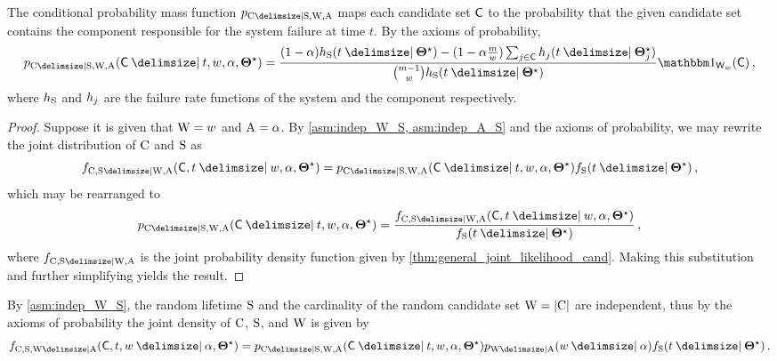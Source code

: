 \documentclass[
    11pt,
    extrafontsizes,
    article,
    oldfontcommands,
    final,
    oneside,
    openany,
    hidelinks]{memoir}
\begin{document}
\begin{corollary}
	\label{def:general_cond_cand_probability_alpha}
	The conditional probability mass function $\pmf_{\rvcand \Given \sv, \RV{W}, \RV{A}}$ maps each candidate set $\cand$ to the probability that the given candidate set contains the component responsible for the system failure at time $t$.
	By the axioms of probability,
	\begin{equation}
	\begin{split}
	\label{eq:general_cond_cand_probability_alpha}
	\pmf_{\rvcand \Given \sv, \RV{W}, \RV{A}}(\cand \Given t, w, \alpha, \tparam\sysparam) =
	\frac{(1-\alpha) \haz_{\sv}(t \Given \tparam\sysparam) - (1-\alpha\frac{m}{w}) \sum_{j \in \cand} \haz_j(t \Given \tparam\sysparam_j)}{\binom{m-1}{w} \haz_{\sv}(t \Given \tparam\sysparam)}
	\SetIndicator{\candsw{w}}(\cand)\,,
	\end{split}
	\end{equation}
	where $h_{\mathrm{S}}$ and $h_j$ are the failure rate functions of the system 
	and the \jth component respectively.
\end{corollary}
\begin{proof}
Suppose it is given that $\mathrm{W} = w$ and $\mathrm{A} = \alpha$.
By \cref{asm:indep_W_S, asm:indep_A_S} and the axioms of probability, we may rewrite the joint distribution of $\mathrm{C}$ and $\mathrm{S}$ as
\begin{equation}
\pdf_{\rvcand,\sv \Given \RV{W}, \RV{A}}(\cand, t \Given w, \alpha, \tparam\sysparam) =
\pmf_{\rvcand \Given \sv, \RV{W}, \RV{A}}(\cand \Given t, w, \alpha, \tparam\sysparam) \spdf(t \Given \tparam\sysparam)\,,
\end{equation}
which may be rearranged to
\begin{equation}
\pmf_{\rvcand \Given \sv, \RV{W}, \RV{A}}(\cand \Given t, w, \alpha, \tparam\sysparam) = \frac
{
	\pdf_{\rvcand, \sv \Given \RV{W}, \RV{A}}(\cand, t \Given w, \alpha, \tparam\sysparam)
}
{
	\spdf(t \Given \tparam\sysparam)
}\,,
\end{equation}
where $\pdf_{\rvcand, \sv \Given \RV{W}, \RV{A}}$ is the joint probability density function given by \cref{thm:general_joint_likelihood_cand}.
Making this substitution and further simplifying yields the result.
\end{proof}

By \cref{asm:indep_W_S}, the random lifetime $\mathrm{S}$ and the cardinality of the random candidate set $\mathrm{W} = \lvert\mathrm{C}\rvert$ are independent, thus by the axioms of probability the joint density of $\mathrm{C}$, $\mathrm{S}$, and $\mathrm{W}$ is given by
\begin{equation}
\pdf_{\rvcand, \sv, \RV{W} \Given \RV{A}}(\cand, t, w \Given \alpha, \tparam\sysparam) = \pmf_{\rvcand \Given \sv, \RV{W}, \RV{A}}(\cand \Given t, w, \alpha, \tparam\sysparam) \pmf_{\RV{W} \Given \RV{A}}(w \Given \alpha) \spdf(t \Given \tparam\sysparam)\,.
\end{equation}
\end{document}
